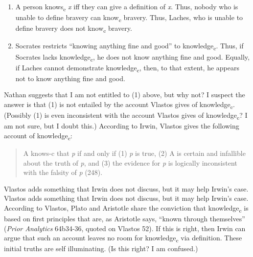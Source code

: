 \documentclass[12pt,letterpaper]{article}
\begin{document}
\begin{enumerate}
    \item  A person knows\textsubscript{c} \textit{x} iff they can give a definition of \textit{x}.
        Thus, nobody who is unable to define bravery can know\textsubscript{c} bravery.
        Thus, Laches, who is unable to define bravery does not know\textsubscript{c} bravery.
    \item Socrates restricts ``knowing anything fine and good'' to knowledge\textsubscript{c}.
        Thus, if Socrates lacks knowledge\textsubscript{c}, he does not know anything fine and good.
        Equally, if Laches cannot demonstrate knowledge\textsubscript{c}, then, to that extent, he appears not to know anything fine and good.
\end{enumerate}

Nathan suggests that I am not entitled to (1) above, but why not?
I suspect the answer is that (1) is not entailed by the account Vlastos gives of knowledge\textsubscript{c}.
(Possibly (1) is even inconsistent with the account Vlastos gives of knowledge\textsubscript{c}?
I am not sure, but I doubt this.)
According to Irwin, Vlastos gives the following account of knowledge\textsubscript{c}:

\begin{quote}
    A knows-c that \textit{p} if and only if (1) \textit{p} is true, (2) A is certain and infallible about the truth of \textit{p}, and (3) the evidence for \textit{p} is logically inconsistent with the falsity of \textit{p} (248).\footnotemark
\end{quote}

Vlastos adds something that Irwin does not discuss, but it may help Irwin's case.
Vlastos adds something that Irwin does not discuss, but it may help Irwin's case.
According to Vlastos, Plato and Aristotle share the conviction that knowledge\textsubscript{c} is based on first principles that are, as Aristotle says, ``known through themselves''
(\textit{Prior Analytics} 64b34-36, quoted on Vlastos 52).
If this is right, then Irwin can argue that such an account leaves no room for knowledge\textsubscript{c} via definition.
These initial truths are self illuminating.
(Is this right?
I am confused.)
\end{document}

